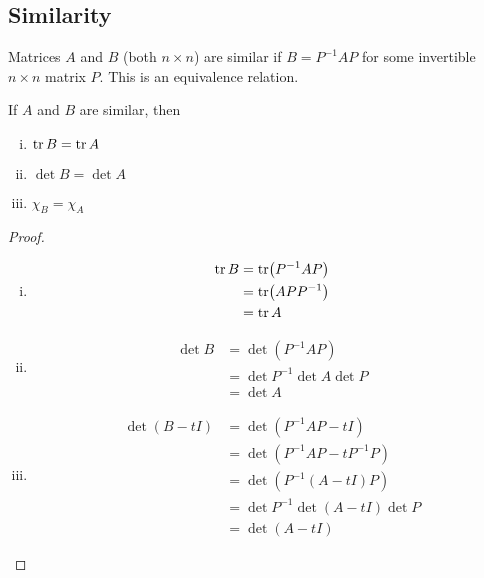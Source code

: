 \subsection{Similarity}
Matrices \(A\) and \(B\) (both \(n \times n\)) are similar if \(B = P^{-1}AP\) for some invertible \(n\times n\) matrix \(P\).
This is an equivalence relation.
\begin{proposition}
	If \(A\) and \(B\) are similar, then
	\begin{enumerate}[(i)]
		\item \(\tr B = \tr A\)
		\item \(\det B = \det A\)
		\item \(\chi_B = \chi_A\)
	\end{enumerate}
\end{proposition}
\begin{proof}
	\begin{enumerate}[(i)]
		\item \begin{align*}
			      \tr B & = \tr (P^{-1}AP) \\&= \tr(APP^{-1}) \\&= \tr A
		      \end{align*}
		\item \begin{align*}
			      \det B & = \det (P^{-1}AP) \\&= \det P^{-1} \det A \det P \\&= \det A
		      \end{align*}
		\item \begin{align*}
			      \det(B - tI) & = \det(P^{-1}AP - tI) \\&= \det(P^{-1}AP - tP^{-1}P) \\&= \det(P^{-1}(A - tI)P) \\&= \det P^{-1} \det(A - tI) \det P \\&= \det(A - tI)
		      \end{align*}
	\end{enumerate}
\end{proof}
